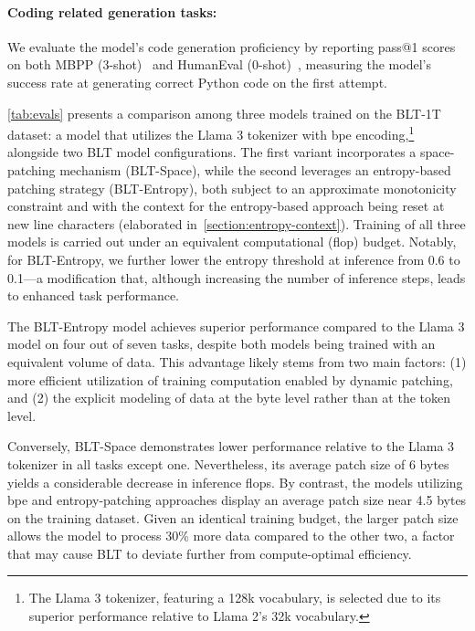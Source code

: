 \paragraph{Coding related generation tasks:} We evaluate the model’s code generation proficiency by reporting pass@1 scores on both MBPP (3-shot)~\citep{Eval_MBPP} and HumanEval (0-shot)~\citep{Eval_HumanEval}, measuring the model’s success rate at generating correct Python code on the first attempt.

\autoref{tab:evals} presents a comparison among three models trained on the {\textsc BLT}-1T dataset: a model that utilizes the Llama 3 tokenizer with bpe encoding,\footnote{The Llama 3 tokenizer, featuring a 128k vocabulary, is selected due to its superior performance relative to Llama 2's 32k vocabulary.} alongside two {\textsc BLT} model configurations. The first variant incorporates a space-patching mechanism ({\textsc BLT}-Space), while the second leverages an entropy-based patching strategy ({\textsc BLT}-Entropy), both subject to an approximate monotonicity constraint and with the context for the entropy-based approach being reset at new line characters (elaborated in~\autoref{section:entropy-context}). Training of all three models is carried out under an equivalent computational (flop) budget. Notably, for {\textsc BLT}-Entropy, we further lower the entropy threshold at inference from 0.6 to 0.1—a modification that, although increasing the number of inference steps, leads to enhanced task performance.

The {\textsc BLT}-Entropy model achieves superior performance compared to the Llama 3 model on four out of seven tasks, despite both models being trained with an equivalent volume of data. This advantage likely stems from two main factors: (1) more efficient utilization of training computation enabled by dynamic patching, and (2) the explicit modeling of data at the byte level rather than at the token level.

Conversely, {\textsc BLT}-Space demonstrates lower performance relative to the Llama 3 tokenizer in all tasks except one. Nevertheless, its average patch size of 6 bytes yields a considerable decrease in inference flops. By contrast, the models utilizing bpe and entropy-patching approaches display an average patch size near 4.5 bytes on the training dataset. Given an identical training budget, the larger patch size allows the model to process 30\% more data compared to the other two, a factor that may cause {\textsc BLT} to deviate further from compute-optimal efficiency.

